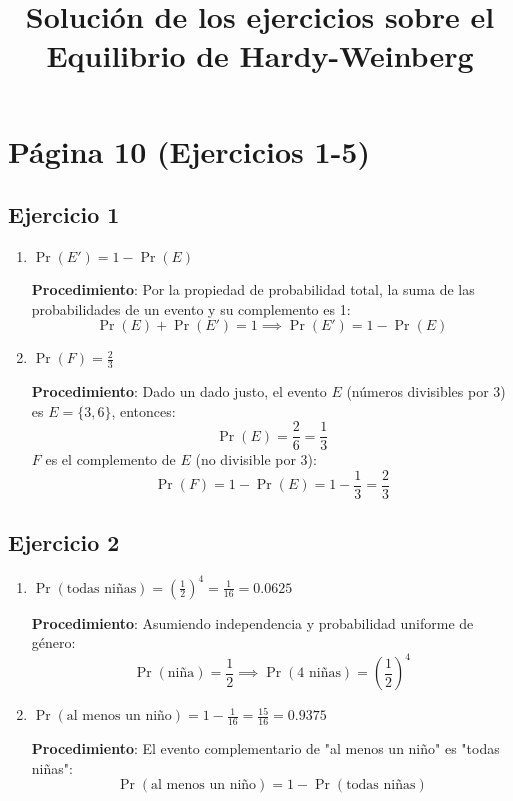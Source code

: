 \documentclass{article}
\title{Solución de los ejercicios sobre el Equilibrio de Hardy-Weinberg}
\author{}
\date{}
\begin{document}
	
	\maketitle
	
	\section*{Página 10 (Ejercicios 1-5)}
	
	\subsection*{Ejercicio 1}
	\begin{enumerate}[label=\alph*)]
		\item \( \Pr(E') = 1 - \Pr(E) \)
		
		\textbf{Procedimiento}: Por la propiedad de probabilidad total, la suma de las probabilidades de un evento y su complemento es 1:
		\[
		\Pr(E) + \Pr(E') = 1 \implies \Pr(E') = 1 - \Pr(E)
		\]
		
		\item \( \Pr(F) = \frac{2}{3} \)
		
		\textbf{Procedimiento}: Dado un dado justo, el evento \( E \) (números divisibles por 3) es \( E = \{3,6\} \), entonces:
		\[
		\Pr(E) = \frac{2}{6} = \frac{1}{3}
		\]
		\( F \) es el complemento de \( E \) (no divisible por 3):
		\[
		\Pr(F) = 1 - \Pr(E) = 1 - \frac{1}{3} = \frac{2}{3}
		\]
	\end{enumerate}
	
	\subsection*{Ejercicio 2}
	\begin{enumerate}[label=\alph*)]
		\item \( \Pr(\text{todas niñas}) = \left( \frac{1}{2} \right)^4 = \frac{1}{16} = 0.0625 \)
		
		\textbf{Procedimiento}: Asumiendo independencia y probabilidad uniforme de género:
		\[
		\Pr(\text{niña}) = \frac{1}{2} \implies \Pr(\text{4 niñas}) = \left( \frac{1}{2} \right)^4
		\]
		
		\item \( \Pr(\text{al menos un niño}) = 1 - \frac{1}{16} = \frac{15}{16} = 0.9375 \)
		
		\textbf{Procedimiento}: El evento complementario de "al menos un niño" es "todas niñas":
		\[
		\Pr(\text{al menos un niño}) = 1 - \Pr(\text{todas niñas})
		\]
	\end{enumerate}
	
\end{document}
